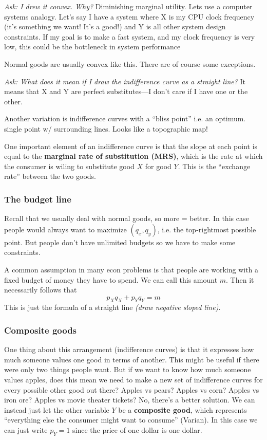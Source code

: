 \documentclass[11pt]{article}
\begin{document}
{\it Ask: I drew it convex. Why?} Diminishing marginal utility. Lets use a computer systems analogy. Let's say I have a system where X is my CPU clock frequency (it's something we want! It's a good!) and Y is all other system design constraints. If my goal is to make a fast system, and my clock frequency is very low, this could be the bottleneck in system performance

Normal goods are usually convex like this. There are of course some exceptions.

{\it Ask: What does it mean if I draw the indifference curve as a straight line?} It means that X and Y are perfect substitutes---I don't care if I have one or the other. 

Another variation is indifference curves with a ``bliss point'' i.e. an optimum. single point w/ surrounding lines. Looks like a topographic map!

One important element of an indifference curve is that the slope at each point is equal to the {\bf marginal rate of substitution (MRS)}, which is the rate at which the consumer is wiling to substitute good $X$ for good $Y$. This is the ``exchange rate'' between the two goods.

\subsubsection{The budget line}

Recall that we usually deal with normal goods, so more = better. In this case people would always want to maximize $(q_x, q_y)$, i.e. the top-rightmost possible point. But people don't have unlimited budgets so we have to make some constraints.

A common assumption in many econ problems is that people are working with a fixed budget of money they have to spend. We can call this amount $m$. Then it necessarily follows that
$$p_Xq_X + p_Yq_Y = m$$
This is just the formula of a straight line {\it (draw negative sloped line)}.


\subsubsection{Composite goods}
One thing about this arrangement (indifference curves) is that it expresses how much someone values one good in terms of another. This might be useful if there were only two things people want. But if we want to know how much someone values apples, does this mean we need to make a new set of indifference curves for every possible other good out there? Apples vs pears? Apples vs corn? Apples vs iron ore? Apples vs movie theater tickets? No, there's a better solution. We can instead just let the other variable $Y$ be a {\bf composite good}, which represents ``everything else the consumer might want to consume'' (Varian). In this case we can just write $p_Y = 1$ since the price of one dollar is one dollar.
\end{document}
